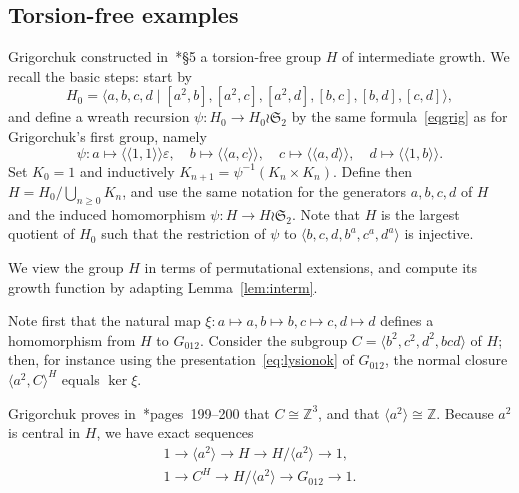 \documentclass{amsart}
\newcommand\Z{\mathbb{Z}}
\newcommand\Grig{{G_{012}}}
\def\pair<#1>{{\langle\!\langle}#1{\rangle\!\rangle}}
\theoremstyle{definition}
\begin{document}
\subsection{Torsion-free examples}\label{ss:tf}
Grigorchuk constructed in~\cite{grigorchuk:pgps}*{\S5} a torsion-free
group $H$ of intermediate growth. We recall the basic steps: start by
\[H_0=\langle a,b,c,d\mid
[a^2,b],[a^2,c],[a^2,d],[b,c],[b,d],[c,d]\rangle,\] and define a
wreath recursion $\psi:H_0\to H_0\wr \mathfrak S_2$ by the same
formula~\eqref{eqgrig} as for Grigorchuk's first group, namely
\[
\psi:a\mapsto\pair<1,1>\varepsilon,\quad b\mapsto\pair<a,c>,\quad
c\mapsto\pair<a,d>,\quad d\mapsto\pair<1,b>.
\]
Set $K_0=1$ and inductively $K_{n+1}=\psi^{-1}(K_n\times K_n)$. Define
then $H=H_0/\bigcup_{n\ge0}K_n$, and use the same notation for the
generators $a,b,c,d$ of $H$ and the induced homomorphism $\psi:H\to
H\wr\mathfrak S_2$. Note that $H$ is the largest quotient of $H_0$
such that the restriction of $\psi$ to $\langle
b,c,d,b^a,c^a,d^a\rangle$ is injective.

We view the group $H$ in terms of permutational extensions, and
compute its growth function by adapting Lemma~\ref{lem:interm}.

Note first that the natural map $\xi:a\mapsto a,b\mapsto b,c\mapsto
c,d\mapsto d$ defines a homomorphism from $H$ to $\Grig$. Consider the
subgroup $C=\langle b^2,c^2,d^2,bcd\rangle$ of $H$; then, for instance
using the presentation~\eqref{eq:lysionok} of $\Grig$, the normal closure
$\langle a^2,C\rangle^H$ equals $\ker\xi$.

Grigorchuk proves in~\cite{grigorchuk:pgps}*{pages~199--200} that
$C\cong\Z^3$, and that $\langle a^2\rangle\cong\Z$.  Because $a^2$ is
central in $H$, we have exact sequences
\begin{gather*}
  1\longrightarrow \langle a^2\rangle\longrightarrow H\longrightarrow H/\langle a^2\rangle\longrightarrow 1,\\
  1\longrightarrow C^H\longrightarrow H/\langle a^2\rangle\longrightarrow\Grig\longrightarrow 1.
\end{gather*}
\end{document}
